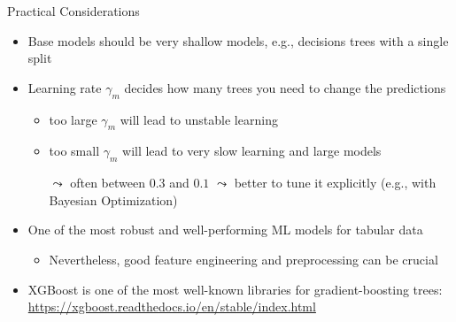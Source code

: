 \documentclass[aspectratio=169]{../latex_main/tntbeamer}  %
\begin{document}
	\begin{frame}[c]{Practical Considerations}

    \begin{itemize}
        \item Base models should be very shallow models, e.g., decisions trees with a single split
        \smallskip
        \item Learning rate $\gamma_m$ decides how many trees you need to change the predictions
        \begin{itemize}
            \item too large $\gamma_m$ will lead to unstable learning
            \item too small $\gamma_m$ will lead to very slow learning and large models
            \item[$\leadsto$] often between $0.3$ and $0.1$ $\leadsto$ better to tune it explicitly (e.g., with Bayesian Optimization)
        \end{itemize}
        \smallskip
        \item One of the most robust and well-performing ML models for tabular data
        \begin{itemize}
            \item Nevertheless, good feature engineering and preprocessing can be crucial
        \end{itemize}
        \smallskip
        \item XGBoost is one of the most well-known libraries for gradient-boosting trees:\\ \url{https://xgboost.readthedocs.io/en/stable/index.html}
    \end{itemize}

	\end{frame}
	
	
\end{document}
